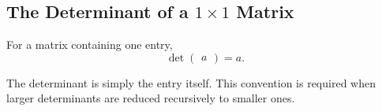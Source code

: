 \subsection{The Determinant of a $1\times1$ Matrix}

\begin{definitionbox}
For a matrix containing one entry,
\[
\det\begin{pmatrix}a\end{pmatrix}=a.
\]
\end{definitionbox}

The determinant is simply the entry itself. This convention is required when larger determinants are reduced recursively to smaller ones.
